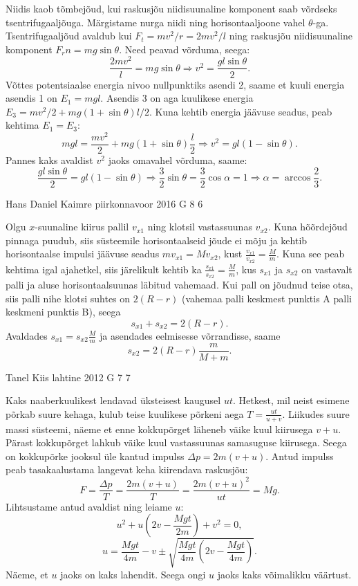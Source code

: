 \documentclass[11pt]{article}
\begin{document}
{{\ifSolution
Niidis kaob tõmbejõud, kui raskusjõu niidisuunaline komponent saab võrdseks tsentrifugaaljõuga. Märgistame nurga niidi ning horisontaaljoone vahel $\theta$-ga. Tsentrifugaaljõud avaldub kui $F_t=mv^2/r=2mv^2/l$ ning raskusjõu niidisuunaline komponent $F_rn=mg\sin\theta$. Need peavad võrduma, seega:
$$\frac{2mv^2}{l}=mg\sin\theta \Rightarrow v^2=\frac{gl\sin\theta}{2}.$$
Võttes potentsiaalse energia nivoo nullpunktiks asendi 2, saame et kuuli energia asendis 1 on $E_1=mgl$. Asendis 3 on aga kuulikese energia $E_3=mv^2/2+mg(1+\sin\theta)l/2$. Kuna kehtib energia jäävuse seadus, peab kehtima $E_1=E_3$:
$$mgl=\frac{mv^2}{2}+mg(1+\sin\theta)\frac{l}{2} \Rightarrow v^2=gl(1-\sin\theta).$$
Pannes kaks avaldist $v^2$ jaoks omavahel võrduma, saame:
$$\frac{gl\sin\theta}{2}=gl(1-\sin\theta)\Rightarrow \frac{3}{2}\sin\theta=\frac{3}{2}\cos\alpha=1 \Rightarrow \alpha=\arccos\frac{2}{3}.$$
\fi
}

{Hans Daniel Kaimre} %
{piirkonnavoor} %
{2016} %
{G 8} %
{6} %
{

\ifSolution
Olgu $x$-suunaline kiirus pallil $v_{x1}$ ning klotsil vastassuunas $v_{x2}$. Kuna hõõrdejõud pinnaga puudub, siis süsteemile horisontaalseid jõude ei mõju ja kehtib horisontaalse impulsi jäävuse seadus $mv_{x1}=Mv_{x2}$, kust $\frac{v_{x1}}{v_{x2}}=\frac{M}{m}$. Kuna see peab kehtima igal ajahetkel, siis järelikult kehtib ka $\frac{s_{x1}}{s_{x2}}=\frac{M}{m}$, kus $s_{x1}$ ja $s_{x2}$ on vastavalt palli ja aluse horisontaalsuunas läbitud vahemaad. Kui pall on jõudnud teise otsa, siis palli nihe klotsi suhtes on $2(R-r)$ (vahemaa palli keskmest punktis A palli keskmeni punktis B), seega
\[
s_{x1}+s_{x2}=2(R-r).
\]
Avaldades $s_{x1} = s_{x2}\frac Mm$ ja asendades eelmisesse võrrandisse, saame 
$$s_{x2}=2(R-r)\frac{m}{M+m}.$$
\fi
}

{Tanel Kiis} %
{lahtine} %
{2012} %
{G 7} %
{7} %
{

\ifSolution
Kaks naaberkuulikest lendavad üksteisest kaugusel $u t$. Hetkest, mil neist esimene põrkab suure kehaga, kulub teise kuulikese põrkeni aega $T=\frac{u t}{u+v}$.
Liikudes suure massi süsteemi, näeme et enne kokkupõrget läheneb väike kuul kiirusega $v + u$. Pärast kokkupõrget lahkub väike kuul vastassuunas samasuguse kiirusega. Seega on kokkupõrke jooksul üle kantud impulss $\Delta p = 2m(v + u)$. Antud impulss peab tasakaalustama langevat keha kiirendava raskusjõu: \[ F=\frac{\Delta p}{T}=\frac{2m(v + u)}{T} = \frac{2m(v + u)^2}{ut}=Mg. \]
Lihtsustame antud avaldist ning leiame $u$:
\[
u^2 + u\left( 2v - \frac{Mgt}{2m}\right) + v^2 = 0,
\]
\[
u = \frac{Mgt}{4m} - v \pm \sqrt{\frac{Mgt}{4m}\left( 2v - \frac{Mgt}{4m}\right)}.
\]
Näeme, et $u$ jaoks on kaks lahendit. Seega ongi $u$ jaoks kaks võimalikku väärtust.
\fi
}

}
\end{document}
